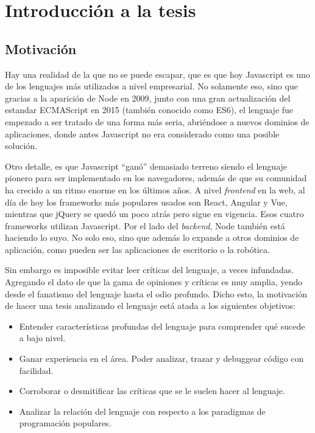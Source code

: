 \chapter{Introducción a la tesis} %

\label{ch:introtesis} %

\section{Motivación}

Hay una realidad de la que no se puede escapar, que es que hoy Javascript es uno de los lenguajes más utilizados a nivel empresarial. No solamente eso, sino que gracias a la aparición de Node en 2009, junto con una gran actualización del estandar ECMAScript en 2015 (también conocido como ES6), el lenguaje fue empezado a ser tratado de una forma más seria, abriéndose a nuevos dominios de aplicaciones, donde antes Javascript no era considerado como una posible solución.

Otro detalle, es que Javascript "`ganó"' demasiado terreno siendo el lenguaje pionero para ser implementado en los navegadores, además de que su comunidad ha crecido a un ritmo enorme en los últimos años. A nivel \textit{frontend} en la web, al día de hoy los frameworks más populares usados son React, Angular y Vue, mientras que jQuery se quedó un poco atrás pero sigue en vigencia. Esos cuatro frameworks utilizan Javascript. Por el lado del \textit{backend}, Node también está haciendo lo suyo. No solo eso, sino que además lo expande a otros dominios de aplicación, como pueden ser las aplicaciones de escritorio o la robótica.

Sin embargo es imposible evitar leer críticas del lenguaje, a veces infundadas. Agregando el dato de que la gama de opiniones y críticas es muy amplia, yendo desde el fanatismo del lenguaje hasta el odio profundo. Dicho esto, la motivación de hacer una tesis analizando el lenguaje está atada a los siguientes objetivos:

\begin{itemize}
\item Entender características profundas del lenguaje para comprender qué sucede a bajo nivel.
\item Ganar experiencia en el área. Poder analizar, trazar y debuggear código con facilidad.
\item Corroborar o desmitificar las críticas que se le suelen hacer al lenguaje.
\item Analizar la relación del lenguaje con respecto a los paradigmas de programación populares.
\end{itemize}

